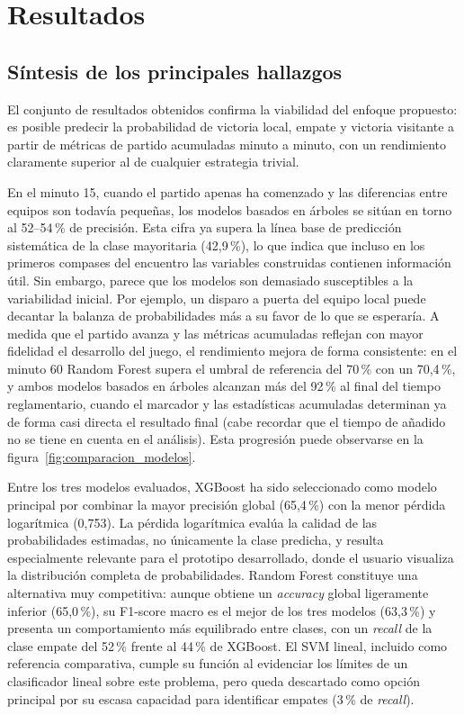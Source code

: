 \chapter{Resultados}

\section{Síntesis de los principales hallazgos}

El conjunto de resultados obtenidos confirma la viabilidad del enfoque propuesto: es posible predecir la probabilidad de victoria local, empate y victoria visitante a partir de métricas de partido acumuladas minuto a minuto, con un rendimiento claramente superior al de cualquier estrategia trivial.

En el minuto 15, cuando el partido apenas ha comenzado y las diferencias entre equipos son todavía pequeñas, los modelos basados en árboles se sitúan en torno al 52--54\,\% de precisión. Esta cifra ya supera la línea base de predicción sistemática de la clase mayoritaria (42,9\,\%), lo que indica que incluso en los primeros compases del encuentro las variables construidas contienen información útil. Sin embargo, parece que los modelos son demasiado susceptibles a la variabilidad inicial. Por ejemplo, un disparo a puerta del equipo local puede decantar la balanza de probabilidades más a su favor de lo que se esperaría. A medida que el partido avanza y las métricas acumuladas reflejan con mayor fidelidad el desarrollo del juego, el rendimiento mejora de forma consistente: en el minuto 60 Random Forest supera el umbral de referencia del 70\,\% con un 70,4\,\%, y ambos modelos basados en árboles alcanzan más del 92\,\% al final del tiempo reglamentario, cuando el marcador y las estadísticas acumuladas determinan ya de forma casi directa el resultado final (cabe recordar que el tiempo de añadido no se tiene en cuenta en el análisis). Esta progresión puede observarse en la figura~\ref{fig:comparacion_modelos}.

Entre los tres modelos evaluados, XGBoost ha sido seleccionado como modelo principal por combinar la mayor precisión global (65,4\,\%) con la menor pérdida logarítmica (0,753). La pérdida logarítmica evalúa la calidad de las probabilidades estimadas, no únicamente la clase predicha, y resulta especialmente relevante para el prototipo desarrollado, donde el usuario visualiza la distribución completa de probabilidades. Random Forest constituye una alternativa muy competitiva: aunque obtiene un \textit{accuracy} global ligeramente inferior (65,0\,\%), su F1-score macro es el mejor de los tres modelos (63,3\,\%) y presenta un comportamiento más equilibrado entre clases, con un \textit{recall} de la clase empate del 52\,\% frente al 44\,\% de XGBoost. El SVM lineal, incluido como referencia comparativa, cumple su función al evidenciar los límites de un clasificador lineal sobre este problema, pero queda descartado como opción principal por su escasa capacidad para identificar empates (3\,\% de \textit{recall}).

